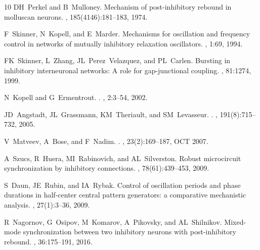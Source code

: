 \documentclass[nofootinbib,aip,amsmath,amssymb,preprint,twocolumn,floatfix,10pt]{revtex4-2}
\begin{document}
\begin{thebibliography}{10}
DH~Perkel and B~Mulloney.
\newblock Mechanism of post-inhibitory rebound in molluscan neurons.
, 185(4146):181--183, 1974.

F~Skinner, N~Kopell, and E~Marder.
\newblock Mechanisms for oscillation and frequency control in networks of
  mutually inhibitory relaxation oscillators.
, 1:69, 1994.

FK~Skinner, L~Zhang, JL~Perez~Velazquez, and PL~Carlen.
\newblock Bursting in inhibitory interneuronal networks: A role for
  gap-junctional coupling.
, 81:1274, 1999.

N~Kopell and G~Ermentrout.
.
, 2:3--54, 2002.

JD~Angstadt, JL~Grassmann, KM~Theriault, and SM~Levasseur.
.
, 191(8):715--732, 2005.
  
V~Matveev, A~Bose, and F~Nadim.
.
, {23}({2}):{169--187},
  {OCT} {2007}.

A~Szucs, R~Huera, MI~Rabinovich, and AL~Silverston.
\newblock Robust microcircuit synchronization by inhibitory connections.
, 78(61):439--453, 2009.

S~Daun, JE~Rubin, and IA~Rybak.
\newblock Control of oscillation periods and phase durations in half-center
  central pattern generators: a comparative mechanistic analysis.
, 27(1):3--36, 2009.

R~Nagornov, G~Osipov, M~Komarov, A~Pikovsky, and AL~Shilnikov.
\newblock Mixed-mode synchronization between two inhibitory neurons with
  post-inhibitory rebound.
,
  36:175--191, 2016.
  

\end{thebibliography}
\end{document}
